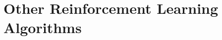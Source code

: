 \setcounter{chapter}{13}

\hypertarget{other-reinforcement-learning-algorithms}{%
\chapter{Other Reinforcement Learning Algorithms}\label{other-reinforcement-learning-algorithms}}
